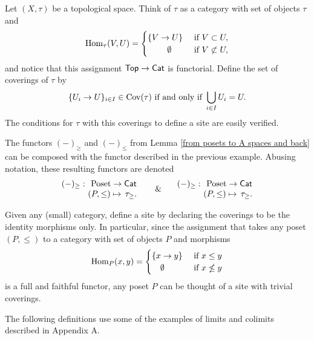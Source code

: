 \documentclass[main.tex]{subfiles}
\begin{document}
\begin{example}\label{open sets as a site}
Let $(X,\tau)$ be a topological space. Think of $\tau$ as a category with set of objects $\tau$ and $$\mathrm{Hom}_\tau(V,U)=\begin{cases}\{V\to U\}& \text{ if } V\subset U,\\ \hspace*{.81cm} \emptyset & \text{ if } V\not\subset U,\end{cases}$$
and notice that this assignment $\mathsf{Top}\to\mathsf{Cat}$ is functorial. Define the set of coverings of $\tau$ by
$$\{U_i\to U\}_{i\in I}\in\Cov(\tau) \text{ if and only if } \bigcup_{i\in I}U_i=U.\vspace*{-3pt}$$
The conditions for $\tau$ with this coverings to define a site are easily verified.
\end{example}

\begin{remark}\label{rmk: Poset -> Top -> site}
The functors $(-)_\geq$ and $(-)_\leq$ from Lemma \ref{from posets to A spaces and back} can be composed with the functor described in the previous example. Abusing notation, these resulting functors are denoted
$$\begin{array}{cc}
(-)_\geq:\!\! & \Poset\to\Cat \\
 & \!\!(P,\leq)\mapsto\,\tau_\geq.
\end{array} \text{\ \ \ \ \  \& \ \ \ } \begin{array}{cc}
(-)_\geq:\!\! & \Poset\to\Cat \\
 & \!\!(P,\leq)\mapsto\,\tau_\geq.
\end{array}$$
\end{remark}

\begin{example}\label{indiscrite site on a poset}
Given any (small) category, define a site by declaring the coverings to be the identity morphisms only. In particular, since the assignment that takes any poset $(P,\leq)$ to a category with set of objects $P$ and morphisms $$\mathrm{Hom}_P(x,y)=\begin{cases}\{x\to y\}& \text{ if } x\leq y\\ \ \ \ \emptyset & \text{ if } x\nleq y\end{cases}$$ is a full and faithful functor, any poset $P$ can be thought of a site with trivial coverings.
\end{example}

The following definitions use some of the examples of limits and colimits described in Appendix A.
\end{document}
